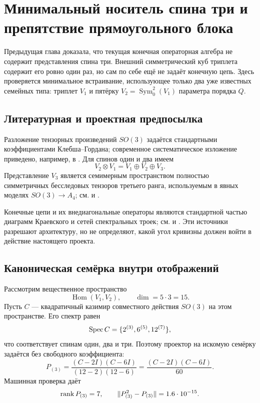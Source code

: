 \chapter{Минимальный носитель спина три и препятствие прямоугольного блока}

Предыдущая глава доказала, что текущая конечная операторная алгебра не
содержит представления спина три. Внешний симметрический куб триплета
содержит его ровно один раз, но сам по себе ещё не задаёт конечную цепь.
Здесь проверяется минимальное встраивание, использующее только два уже
известных семейных типа: триплет $V_1$ и пятёрку
$V_2=\operatorname{Sym}^2_0(V_1)$ параметра порядка $Q$.

\section{Литературная и проектная предпосылка}

Разложение тензорных произведений $SO(3)$ задаётся стандартными
коэффициентами Клебша--Гордана; современное систематическое изложение
приведено, например, в . Для спинов один и два
имеем
\begin{equation}
 V_2\otimes V_1=V_1\oplus V_2\oplus V_3.
 \label{eq:v6-spin-one-two-clebsch-gordan}
\end{equation}
Представление $V_3$ является семимерным пространством полностью
симметричных бесследовых тензоров третьего ранга, используемым в явных
моделях $SO(3)\to A_4$; см.  и
.

Конечные цепи и их внедиагональные операторы являются стандартной частью
диаграмм Краевского и сетей спектральных троек; см.
 и . Эти источники
разрешают архитектуру, но не определяют, какой угол кривизны должен войти
в действие настоящего проекта.

\section{Каноническая семёрка внутри отображений}

Рассмотрим вещественное пространство
\begin{equation}
 \operatorname{Hom}(V_1,V_2),
 \qquad \dim=5\cdot3=15.
\end{equation}
Пусть $C$ --- квадратичный казимир совместного действия $SO(3)$ на этом
пространстве. Его спектр равен
\begin{equation}
 \operatorname{Spec} C=\{2^{(3)},6^{(5)},12^{(7)}\},
 \label{eq:v6-hom-casimir-spectrum}
\end{equation}
что соответствует спинам один, два и три. Поэтому проектор на искомую
семёрку задаётся без свободного коэффициента:
\begin{equation}
 P_{(3)}=\frac{(C-2I)(C-6I)}{(12-2)(12-6)}
 =\frac{(C-2I)(C-6I)}{60}.
 \label{eq:v6-spin-three-casimir-projector}
\end{equation}
Машинная проверка даёт
\begin{equation}
 \operatorname{rank} P_{(3)}=7,
 \qquad
 \|P_{(3)}^2-P_{(3)}\|=1.6\cdot10^{-15}.
\end{equation}


